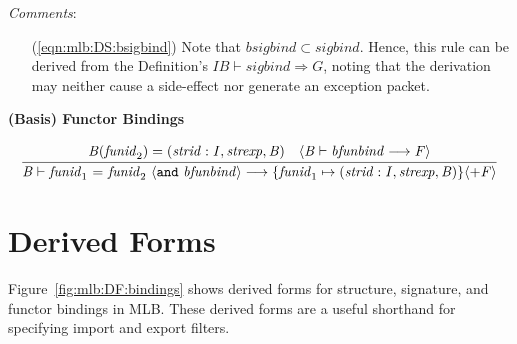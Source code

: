 \documentclass[draft]{article}
\renewcommand{\mit}[1]{\mathit{#1}}
\newcommand{\mtt}[1]{\mathtt{#1}}
\newcommand{\infrule}[2]{{\frac{\displaystyle\strut{#1}}{\displaystyle\strut{#2}}}}
\newcommand{\judge}[2]{\infrule{#1}{#2}}
\begin{document}
\begin{samepage}
\noindent
\textit{Comments}:
\begin{itemize}
\item[(\ref{eqn:mlb:DS:bsigbind})] Note that $\mit{bsigbind} \subset
\mit{sigbind}$.  Hence, this rule can be derived from the
Definition's $\mit{IB} \vdash \mit{sigbind} \Rightarrow \mit{G}$, noting that
the derivation may neither cause a side-effect nor generate an
exception packet.
\end{itemize}
\end{samepage}

\vspace{2\parsep}
{\large\noindent
\textbf{(Basis) Functor Bindings} \hfill 
\fbox{$\mit{B} \vdash \mit{bfunbind} \longrightarrow \mit{F}$}
}\nopagebreak

\begin{equation}
\judge{
\mit{B}(\mit{funid}_2) = (\mit{strid}:\mit{I},\mit{strexp},\mit{B}) \quad
\langle\mit{B} \vdash \mit{bfunbind} \longrightarrow \mit{F}\rangle
}{
\mit{B} \vdash \mit{funid}_1 ~\mtt{=}~ \mit{funid}_2 ~\langle\mtt{and}~\mit{bfunbind}\rangle \longrightarrow 
\{\mit{funid}_1 \mapsto (\mit{strid}:\mit{I},\mit{strexp},\mit{B})\} \langle+ \mit{F}\rangle
}
\end{equation}

\appendix
\section{Derived Forms}
\label{sec:mlb:DerivedForms}
Figure~\ref{fig:mlb:DF:bindings} shows derived forms for structure,
signature, and functor bindings in MLB.  These derived forms are
a useful shorthand for specifying import and export filters.
\end{document}
